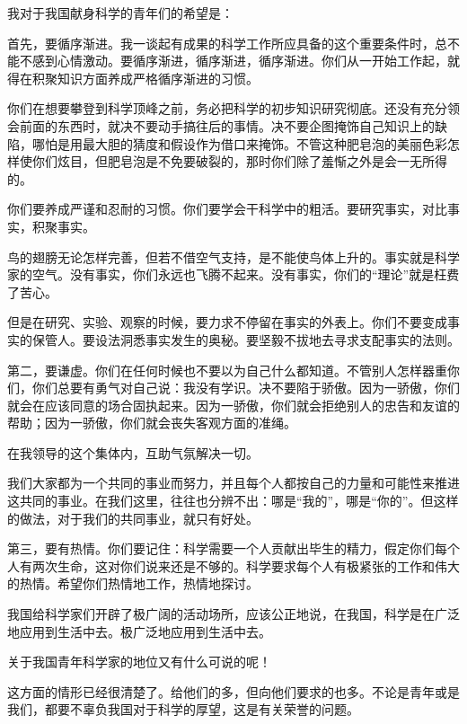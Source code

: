 \documentclass[12pt,UTF-8,openany]{ctexbook}
\begin{document}
\begin{normalsize}
    
    我对于我国献身科学的青年们的希望是：
    
    首先，要循序渐进。我一谈起有成果的科学工作所应具备的这个重要条件时，总不能不感到心情激动。要循序渐进，循序渐进，循序渐进。你们从一开始工作起，就得在积聚知识方面养成严格循序渐进的习惯。
    
    你们在想要攀登到科学顶峰之前，务必把科学的初步知识研究彻底。还没有充分领会前面的东西时，就决不要动手搞往后的事情。决不要企图掩饰自己知识上的缺陷，哪怕是用最大胆的猜度和假设作为借口来掩饰。不管这种肥皂泡的美丽色彩怎样使你们炫目，但肥皂泡是不免要破裂的，那时你们除了羞惭之外是会一无所得的。
    
    你们要养成严谨和忍耐的习惯。你们要学会干科学中的粗活。要研究事实，对比事实，积聚事实。
    
    鸟的翅膀无论怎样完善，但若不借空气支持，是不能使鸟体上升的。事实就是科学家的空气。没有事实，你们永远也飞腾不起来。没有事实，你们的“理论”就是枉费了苦心。
    
    但是在研究、实验、观察的时候，要力求不停留在事实的外表上。你们不要变成事实的保管人。要设法洞悉事实发生的奥秘。要坚毅不拔地去寻求支配事实的法则。
    
    第二，要谦虚。你们在任何时候也不要以为自己什么都知道。不管别人怎样器重你们，你们总要有勇气对自己说：我没有学识。决不要陷于骄傲。因为一骄傲，你们就会在应该同意的场合固执起来。因为一骄傲，你们就会拒绝别人的忠告和友谊的帮助；因为一骄傲，你们就会丧失客观方面的准绳。
    
    在我领导的这个集体内，互助气氛解决一切。
    
    我们大家都为一个共同的事业而努力，并且每个人都按自己的力量和可能性来推进这共同的事业。在我们这里，往往也分辨不出：哪是“我的”，哪是“你的”。但这样的做法，对于我们的共同事业，就只有好处。
    
    第三，要有热情。你们要记住：科学需要一个人贡献出毕生的精力，假定你们每个人有两次生命，这对你们说来还是不够的。科学要求每个人有极紧张的工作和伟大的热情。希望你们热情地工作，热情地探讨。
    
    我国给科学家们开辟了极广阔的活动场所，应该公正地说，在我国，科学是在广泛地应用到生活中去。极广泛地应用到生活中去。
    
    关于我国青年科学家的地位又有什么可说的呢！
    
    这方面的情形已经很清楚了。给他们的多，但向他们要求的也多。不论是青年或是我们，都要不辜负我国对于科学的厚望，这是有关荣誉的问题。
    
\end{normalsize}
\end{document}
